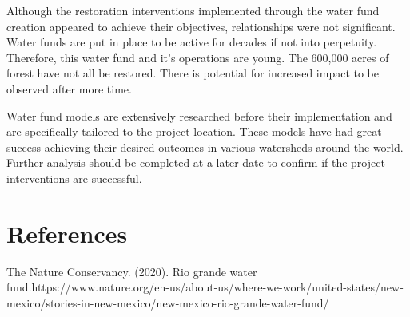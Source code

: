 \documentclass[
  12pt,
]{article}
\begin{document}
Although the restoration interventions implemented through the water
fund creation appeared to achieve their objectives, relationships were
not significant. Water funds are put in place to be active for decades
if not into perpetuity. Therefore, this water fund and it's operations
are young. The 600,000 acres of forest have not all be restored. There
is potential for increased impact to be observed after more time.

Water fund models are extensively researched before their implementation
and are specifically tailored to the project location. These models have
had great success achieving their desired outcomes in various watersheds
around the world. Further analysis should be completed at a later date
to confirm if the project interventions are successful.

\newpage

\hypertarget{references}{%
\section{References}\label{references}}

The Nature Conservancy. (2020). Rio grande water
fund.https://www.nature.org/en-us/about-us/where-we-work/united-states/new-mexico/stories-in-new-mexico/new-mexico-rio-grande-water-fund/
\end{document}

